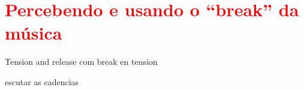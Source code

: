 
\section{\textcolor{red}{Percebendo e usando o ``break'' da música}}

Tension and release com break en tension

escutar as cadencias
